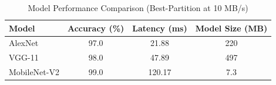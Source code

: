 \begin{table}[htbp]
\centering
\caption{Model Performance Comparison (Best-Partition at 10 MB/s)}
\label{tab:model_comparison}
\begin{tabular}{lccc}
\toprule
\textbf{Model} & \textbf{Accuracy (\%)} & \textbf{Latency (ms)} & \textbf{Model Size (MB)} \\
\midrule
AlexNet & 97.0 & 21.88 & 220 \\
VGG-11 & 98.0 & 47.89 & 497 \\
MobileNet-V2 & 99.0 & 120.17 & 7.3 \\
\bottomrule
\end{tabular}
\end{table}